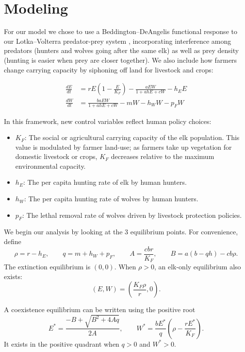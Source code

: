 \documentclass[11pt]{amsart}
\begin{document}
\section{Modeling}

For our model we chose to use a Beddington--DeAngelis functional response to our Lotka--Volterra predator-prey system \cite{beddington1975,deangelis1975}, incorporating interference among predators (hunters and wolves going after the same elk) as well as prey density (hunting is easier when prey are closer together). We also include how farmers change carrying capacity by siphoning off land for livestock and crops:

\begin{align*}
\frac{dE}{dt} &= rE\left(1-\frac{E}{K_F}\right)
-\frac{aEW}{1+ahE+cW}-h_EE \\
\frac{dW}{dt} &= \frac{baEW}{1+ahE+cW}
-mW-h_WW-p_FW
\end{align*}

In this framework, new control variables reflect human policy choices:

\begin{itemize}
    \item \textbf{$K_F$}: The social or agricultural carrying capacity of the elk population. This value is modulated by farmer land-use; as farmers take up vegetation for domestic livestock or crops, $K_F$ decreases relative to the maximum environmental capacity.

    \item \textbf{$h_E$}: The per capita hunting rate of elk by human hunters.

    \item \textbf{$h_W$}: The per capita hunting rate of wolves by human hunters.

    \item \textbf{$p_F$}: The lethal removal rate of wolves driven by livestock protection policies.
\end{itemize}

We begin our analysis by looking at the 3 equilibrium points.
For convenience, define
\[
\rho=r-h_E,\qquad q=m+h_W+p_F,\qquad
A=\frac{cbr}{K_F},\qquad
B=a(b-qh)-cb\rho.
\]
The extinction equilibrium is $(0,0)$. When $\rho>0$, an elk-only
equilibrium also exists:
\[
(E,W)=\left(\frac{K_F\rho}{r},0\right).
\]

A coexistence equilibrium can be written using the positive root
\[
E^*=\frac{-B+\sqrt{B^2+4Aq}}{2A},
\qquad
W^*=\frac{bE^*}{q}
\left(\rho-\frac{rE^*}{K_F}\right).
\]
It exists in the positive quadrant when $q>0$ and $W^*>0$.
\end{document}
